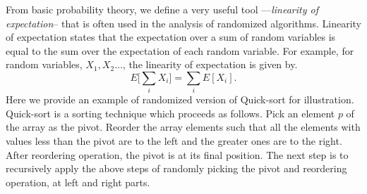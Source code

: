 From basic probability theory, we define a very useful tool ---\textit{linearity of expectation}-- that is often used in the analysis of randomized algorithms.
Linearity of expectation states that the expectation over a sum of random variables is equal to the sum over the expectation of each random variable.
For example, for random variables, $X_1, X_2 \ldots$, the linearity of expectation is given by.
\begin{equation}
 E\big[\sum_i X_i\big] = \sum_i E[X_i].
\end{equation}
Here we provide an example of randomized version of Quick-sort for illustration. 
Quick-sort is a sorting technique which proceeds as follows.
Pick an element $p$ of the array as the pivot.
Reorder the array elements such that all the elements with values less than the pivot are to the left and the greater ones are to the right. After reordering operation, the pivot is at its final position.
The next step is to recursively apply the above steps of randomly picking the pivot and reordering operation, at left and right parts.

